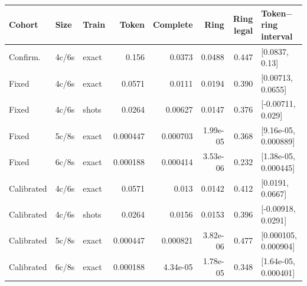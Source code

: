 \begin{tabular}{lllrrrrl}
\toprule
Cohort & Size & Train & Token & Complete & Ring & Ring legal & Token$-$ring interval\\
\midrule
Confirm. & 4c/6s & exact & 0.156 & 0.0373 & 0.0488 & 0.447 & [0.0837, 0.13]\\
Fixed & 4c/6s & exact & 0.0571 & 0.0111 & 0.0194 & 0.390 & [0.00713, 0.0655]\\
Fixed & 4c/6s & shots & 0.0264 & 0.00627 & 0.0147 & 0.376 & [-0.00711, 0.029]\\
Fixed & 5c/8s & exact & 0.000447 & 0.000703 & 1.99e-05 & 0.368 & [9.16e-05, 0.000889]\\
Fixed & 6c/8s & exact & 0.000188 & 0.000414 & 3.53e-06 & 0.232 & [1.38e-05, 0.000445]\\
Calibrated & 4c/6s & exact & 0.0571 & 0.013 & 0.0142 & 0.412 & [0.0191, 0.0667]\\
Calibrated & 4c/6s & shots & 0.0264 & 0.0156 & 0.0153 & 0.396 & [-0.00918, 0.0291]\\
Calibrated & 5c/8s & exact & 0.000447 & 0.000821 & 3.82e-06 & 0.477 & [0.000105, 0.000904]\\
Calibrated & 6c/8s & exact & 0.000188 & 4.34e-05 & 1.78e-05 & 0.348 & [1.64e-05, 0.000401]\\
\bottomrule
\end{tabular}
